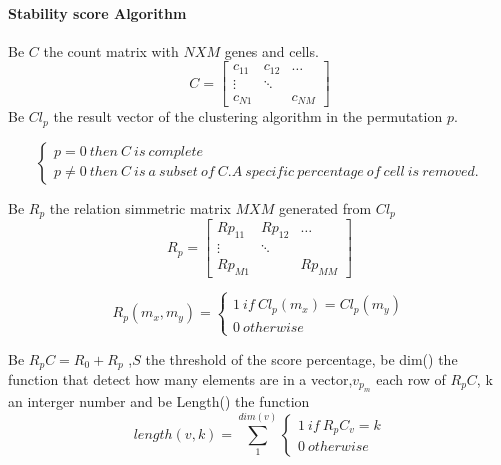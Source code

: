 \documentclass[12pt]{article}
\begin{document}
\setcounter{page}{34}



\paragraph{Stability score Algorithm}
Be $C$ the count matrix with $NXM$ genes and cells.
\[
C = \begin{bmatrix} 
    c_{11} & c_{12} & \dots \\
    \vdots & \ddots & \\
    c_{N1} &        & c_{NM} 
    \end{bmatrix}
\]
Be $Cl_p$ the result vector of the clustering algorithm in the permutation $p$.



 \[
   \left\{
                \begin{array}{ll}
                  p = 0 \ then \ C \ is \ complete\\
                  p \neq 0 \ then \ C \ is \ a \ subset \ of \ C. A \ specific\ percentage\ of\ cell\ is\ removed. 
                \end{array}
              \right.
  \]
  
 Be $R_p$ the relation simmetric matrix $MXM$ generated from $Cl_p$   
\[
R_p = \begin{bmatrix} 
    Rp_{11} & Rp_{12} & \dots \\
    \vdots & \ddots & \\
    Rp_{M1} &        & Rp_{MM} 
    \end{bmatrix}
\]

 \[
   R_p(m_x,m_y)=\left\{
                \begin{array}{ll}
                 1 \ if \ Cl_p(m_x)=Cl_p(m_y)\\
                 0 \ otherwise 
                \end{array}
              \right.
  \]

Be $R_pC = R_0 + R_p$ ,$S$ the threshold of the score percentage, be dim() the function that detect how many elements are in a vector,$v_{p_m}$ each row of $R_pC$, k an interger number and be Length() the function 
 \[
   length(v,k)=\sum\limits_{1}^{dim(v)}\left\{
                \begin{array}{ll}
                 1 \ if \ R_pC_{v} = k\\
                 0 \ otherwise 
                \end{array}
              \right.
  \]
  
\end{document}
